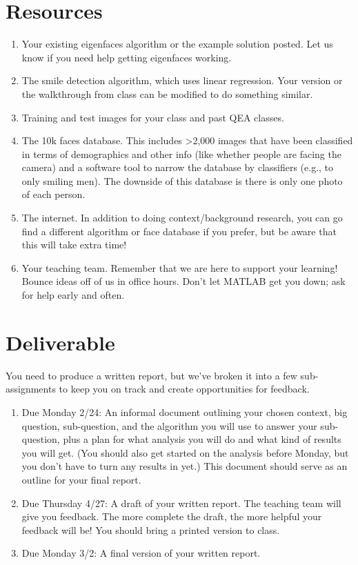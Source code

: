\section{Resources}
\begin{enumerate}
\item Your existing eigenfaces algorithm or the example solution posted. Let us know if you need help getting eigenfaces working.
\item The smile detection algorithm, which uses linear regression. Your version or the walkthrough from class can be modified to do something similar.
\item Training and test images for your class and past QEA classes.
\item The 10k faces database. This includes >2,000 images that have been classified in terms of demographics and other info (like whether people are facing the camera) and a software tool to narrow the database by classifiers (e.g., to only smiling men). The downside of this database is there is only one photo of each person.
\item The internet. In addition to doing context/background research, you can go find a different algorithm or face database if you prefer, but be aware that this will take extra time!
\item Your teaching team. Remember that we are here to support your learning! Bounce ideas off of us in office hours. Don't let MATLAB get you down; ask for help early and often.
\end{enumerate}


\section{Deliverable}

You need to produce a written report, but we've broken it into a few sub-assignments to keep you on track and create opportunities for feedback.
\begin{enumerate}
\item Due Monday 2/24: An informal document outlining your chosen context, big question, sub-question, and the algorithm you will use to answer your sub-question, plus a plan for what analysis you will do and what kind of results you will get. (You should  also get started on the analysis before Monday, but you don't have to turn any results in yet.) This document should serve as an outline for your final report.
\item Due Thursday 4/27: A draft of your written report. The teaching team will give you feedback. The more complete the draft, the more helpful your feedback will be! You should bring a printed version to class.
\item Due Monday 3/2: A final version of your written report.
\end{enumerate}

